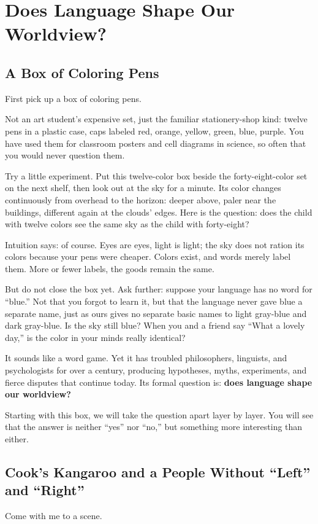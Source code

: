 \chapter{Does Language Shape Our Worldview?}
\section{A Box of Coloring Pens}
First pick up a box of coloring pens.

Not an art student's expensive set, just the familiar stationery-shop kind: twelve pens in a plastic case, caps labeled red, orange, yellow, green, blue, purple. You have used them for classroom posters and cell diagrams in science, so often that you would never question them.

Try a little experiment. Put this twelve-color box beside the forty-eight-color set on the next shelf, then look out at the sky for a minute. Its color changes continuously from overhead to the horizon: deeper above, paler near the buildings, different again at the clouds' edges. Here is the question: does the child with twelve colors see the same sky as the child with forty-eight?

Intuition says: of course. Eyes are eyes, light is light; the sky does not ration its colors because your pens were cheaper. Colors exist, and words merely label them. More or fewer labels, the goods remain the same.

But do not close the box yet. Ask further: suppose your language has no word for ``blue.'' Not that you forgot to learn it, but that the language never gave blue a separate name, just as ours gives no separate basic names to light gray-blue and dark gray-blue. Is the sky still blue? When you and a friend say ``What a lovely day,'' is the color in your minds really identical?

It sounds like a word game. Yet it has troubled philosophers, linguists, and psychologists for over a century, producing hypotheses, myths, experiments, and fierce disputes that continue today. Its formal question is: \textbf{does language shape our worldview?}

Starting with this box, we will take the question apart layer by layer. You will see that the answer is neither ``yes'' nor ``no,'' but something more interesting than either.

\section{Cook's Kangaroo and a People Without ``Left'' and ``Right''}
Come with me to a scene.

